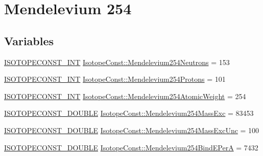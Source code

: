 \hypertarget{group___isotope_const-_mendelevium-_md254}{}\section{Mendelevium 254}
\label{group___isotope_const-_mendelevium-_md254}
\subsection*{Variables}
\begin{DoxyCompactItemize}
\item 
\mbox{\hyperlink{group___isotope_const-_macros_ga5f18360b3e99483a35c32d789e62621c}{I\+S\+O\+T\+O\+P\+E\+C\+O\+N\+S\+T\+\_\+\+I\+NT}} \mbox{\hyperlink{group___isotope_const-_mendelevium-_md254_gacc06c7f91de9bdf8dbc102fff19da1bc}{Isotope\+Const\+::\+Mendelevium254\+Neutrons}} = 153
\item 
\mbox{\hyperlink{group___isotope_const-_macros_ga5f18360b3e99483a35c32d789e62621c}{I\+S\+O\+T\+O\+P\+E\+C\+O\+N\+S\+T\+\_\+\+I\+NT}} \mbox{\hyperlink{group___isotope_const-_mendelevium-_md254_ga92cba6cd190a426165e9895a3a55fd61}{Isotope\+Const\+::\+Mendelevium254\+Protons}} = 101
\item 
\mbox{\hyperlink{group___isotope_const-_macros_ga5f18360b3e99483a35c32d789e62621c}{I\+S\+O\+T\+O\+P\+E\+C\+O\+N\+S\+T\+\_\+\+I\+NT}} \mbox{\hyperlink{group___isotope_const-_mendelevium-_md254_ga56dbb2fb34fdbdd1665ccd1483652c84}{Isotope\+Const\+::\+Mendelevium254\+Atomic\+Weight}} = 254
\item 
\mbox{\hyperlink{group___isotope_const-_macros_ga8f45a7272ce02c0b4c65c44636ed719a}{I\+S\+O\+T\+O\+P\+E\+C\+O\+N\+S\+T\+\_\+\+D\+O\+U\+B\+LE}} \mbox{\hyperlink{group___isotope_const-_mendelevium-_md254_gaad17d5f95da37dcaeb8776459a26a579}{Isotope\+Const\+::\+Mendelevium254\+Mass\+Exc}} = 83453
\item 
\mbox{\hyperlink{group___isotope_const-_macros_ga8f45a7272ce02c0b4c65c44636ed719a}{I\+S\+O\+T\+O\+P\+E\+C\+O\+N\+S\+T\+\_\+\+D\+O\+U\+B\+LE}} \mbox{\hyperlink{group___isotope_const-_mendelevium-_md254_gabacb928485914ce5a5ab00cecae67c43}{Isotope\+Const\+::\+Mendelevium254\+Mass\+Exc\+Unc}} = 100
\item 
\mbox{\hyperlink{group___isotope_const-_macros_ga8f45a7272ce02c0b4c65c44636ed719a}{I\+S\+O\+T\+O\+P\+E\+C\+O\+N\+S\+T\+\_\+\+D\+O\+U\+B\+LE}} \mbox{\hyperlink{group___isotope_const-_mendelevium-_md254_ga45163465feacbea8c2c8fe27325a2481}{Isotope\+Const\+::\+Mendelevium254\+Bind\+E\+PerA}} = 7432

\end{DoxyCompactItemize}
